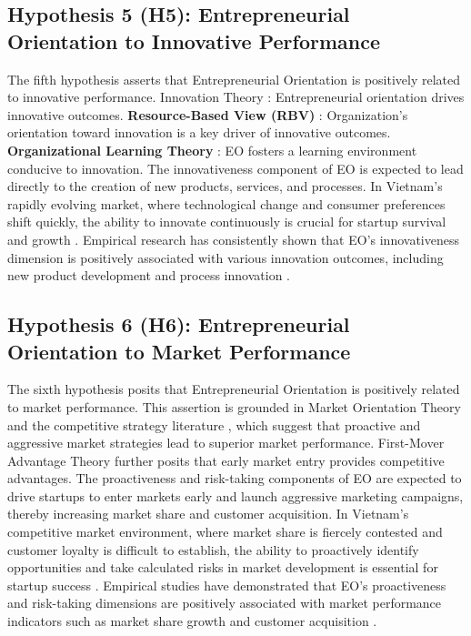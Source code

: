 \documentclass[../Main.tex]{subfiles}
\begin{document}
    \subsection{Hypothesis 5 (H5): Entrepreneurial Orientation to Innovative Performance}
    The fifth hypothesis asserts that Entrepreneurial Orientation is positively related to innovative performance. Innovation Theory \autocite{schumpeter1934theory}: Entrepreneurial orientation drives innovative outcomes. 
    \textbf{Resource-Based View (RBV)} \autocite{barney1991firm}: Organization's orientation toward innovation is a key driver of innovative outcomes. 
    \textbf{Organizational Learning Theory} \autocite{argyris1978organizational}: EO fosters a learning environment conducive to innovation. The innovativeness component of EO is expected to lead directly to the creation of new products, services, and processes. In Vietnam's rapidly evolving market, where technological change and consumer preferences shift quickly, the ability to innovate continuously is crucial for startup survival and growth \autocite{vietnam_innovation_report_2024}. Empirical research has consistently shown that EO's innovativeness dimension is positively associated with various innovation outcomes, including new product development and process innovation \autocite{lumpkin1996clarifying, wiklund2003knowledge}.

    \subsection{Hypothesis 6 (H6): Entrepreneurial Orientation to Market Performance}
    The sixth hypothesis posits that Entrepreneurial Orientation is positively related to market performance. This assertion is grounded in Market Orientation Theory \autocite{narver1990effect} and the competitive strategy literature \autocite{porter1980competitive}, which suggest that proactive and aggressive market strategies lead to superior market performance. First-Mover Advantage Theory \autocite{lieberman1988first} further posits that early market entry provides competitive advantages. The proactiveness and risk-taking components of EO are expected to drive startups to enter markets early and launch aggressive marketing campaigns, thereby increasing market share and customer acquisition. In Vietnam's competitive market environment, where market share is fiercely contested and customer loyalty is difficult to establish, the ability to proactively identify opportunities and take calculated risks in market development is essential for startup success \autocite{vietnam_innovation_report_2024}. Empirical studies have demonstrated that EO's proactiveness and risk-taking dimensions are positively associated with market performance indicators such as market share growth and customer acquisition \autocite{lumpkin2001linking, wiklund2005entrepreneurial}.
\end{document}
